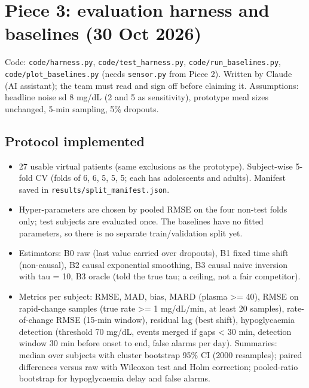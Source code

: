 \documentclass[11pt,a4paper]{article}
\providecommand{\tightlist}{\setlength{\itemsep}{0pt}\setlength{\parskip}{0pt}}
\begin{document}
\hypertarget{piece-3-evaluation-harness-and-baselines-30-oct-2026}{%
\section{Piece 3: evaluation harness and baselines (30 Oct
2026)}\label{piece-3-evaluation-harness-and-baselines-30-oct-2026}}

Code: \texttt{code/harness.py}, \texttt{code/test\_harness.py},
\texttt{code/run\_baselines.py}, \texttt{code/plot\_baselines.py} (needs
\texttt{sensor.py} from Piece 2). Written by Claude (AI assistant); the
team must read and sign off before claiming it. Assumptions: headline
noise sd 8 mg/dL (2 and 5 as sensitivity), prototype meal sizes
unchanged, 5-min sampling, 5\% dropouts.

\hypertarget{protocol-implemented}{%
\subsection{Protocol implemented}\label{protocol-implemented}}

\begin{itemize}
\tightlist
\item
  27 usable virtual patients (same exclusions as the prototype).
  Subject-wise 5-fold CV (folds of 6, 6, 5, 5, 5; each has adolescents
  and adults). Manifest saved in \texttt{results/split\_manifest.json}.
\item
  Hyper-parameters are chosen by pooled RMSE on the four non-test folds
  only; test subjects are evaluated once. The baselines have no fitted
  parameters, so there is no separate train/validation split yet.
\item
  Estimators: B0 raw (last value carried over dropouts), B1 fixed time
  shift (non-causal), B2 causal exponential smoothing, B3 causal naive
  inversion with tau = 10, B3 oracle (told the true tau; a ceiling, not
  a fair competitor).
\item
  Metrics per subject: RMSE, MAD, bias, MARD (plasma \textgreater= 40),
  RMSE on rapid-change samples (\textbar true rate\textbar{}
  \textgreater= 1 mg/dL/min, at least 20 samples), rate-of-change RMSE
  (15-min window), residual lag (best shift), hypoglycaemia detection
  (threshold 70 mg/dL, events merged if gaps \textless{} 30 min,
  detection window 30 min before onset to end, false alarms per day).
  Summaries: median over subjects with cluster bootstrap 95\% CI (2000
  resamples); paired differences versus raw with Wilcoxon test and Holm
  correction; pooled-ratio bootstrap for hypoglycaemia delay and false
  alarms.
\end{itemize}
\end{document}
